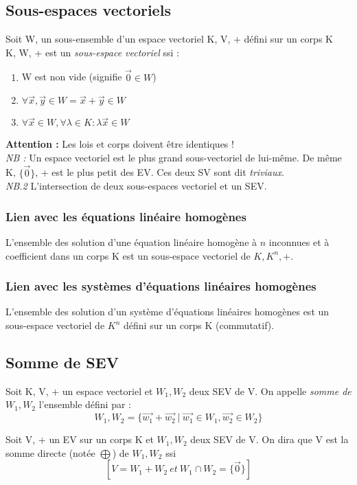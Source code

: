 \documentclass[12pt, a4paper, openany]{article}
\begin{document}
\subsection{Sous-espaces vectoriels}
Soit W, un sous-ensemble d'un espace vectoriel K, V, + défini sur un corps K\\
K, W, + est un \textit{sous-espace vectoriel} ssi :
\begin{enumerate}
\item W est non vide (signifie $\vec{0} \in W$)
\item $\forall \vec{x}, \vec{y} \in W = \vec{x} + \vec{y} \in W$
\item $\forall \vec{x} \in W, \forall \lambda \in K : \lambda\vec{x} \in W$
\end{enumerate}
\textbf{Attention :} Les lois et corps doivent être identiques !\\
\textit{NB :} Un espace vectoriel est le plus grand sous-vectoriel de lui-même. De même K, $\{\vec{0}\}$, + est le plus petit des EV. Ces deux SV sont dit \textit{triviaux}.\\
\textit{NB.2 } L'intersection de deux sous-espaces vectoriel et un SEV.

\subsubsection{Lien avec les équations linéaire homogènes}
L'ensemble des solution d'une équation linéaire homogène à $n$ inconnues et à coefficient dans un corps K est un sous-espace vectoriel de $K, K^{n}, +$.

\subsubsection{Lien avec les systèmes d'équations linéaires homogènes}
L'ensemble des solution d'un système d'équations linéaires homogènes est un sous-espace vectoriel de $K^{n}$ défini sur un corps K (commutatif).

\subsection{Somme de SEV}
Soit K, V, + un espace vectoriel et $W_{1}, W_{2}$ deux SEV de V. On appelle \textit{somme de $W_{1}, W_{2}$} l'ensemble défini par :
$$W_{1}, W_{2} = \{\vec{w_{1}} + \vec{w_{2}}\ |\ \vec{w_{1}} \in W_{1}, \vec{w_{2}} \in W_{2}\}$$

Soit V, + un  EV sur un corps K et $W_{1}, W_{2}$ deux SEV de V. On dira que V est la somme directe (notée $\bigoplus$) de $W_{1}, W_{2}$ ssi
$$[V = W_{1} + W_{2}\ et\ W_{1} \cap W_{2} = \{\vec{0}\}]$$
\end{document}
